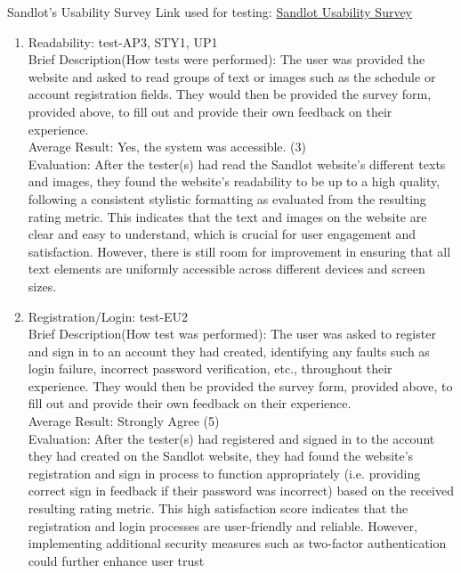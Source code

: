 \documentclass[12pt, titlepage]{article}
\begin{document}
Sandlot's Usability Survey Link used for testing: \href{https://forms.office.com/Pages/ResponsePage.aspx?id=B2M3RCm0rUKMJSjNSW9HcodvkeIlB8lOjrmyIWuVT7dUQ0hBNFRVTjFHWVhITDIzSklZRDRYTVZRMi4u}{Sandlot Usability Survey}

\begin{enumerate}
  \item{Readability: test-AP3, STY1, UP1\\}
  Brief Description(How tests were performed): The user was provided the website and asked
  to read groups of text or images such as the schedule or account registration fields.
  They would then be provided the survey form, provided above, to fill out and provide their own feedback
  on their experience. \\
  Average Result: Yes, the system was accessible. (3)\\
  Evaluation: After the tester(s) had read the Sandlot website's different texts and images,
  they found the website's readability to be up to a high quality, following a consistent
  stylistic formatting as evaluated from the resulting rating metric. This indicates that the
  text and images on the website are clear and easy to understand, which is crucial for user
  engagement and satisfaction. However, there is still room for improvement in ensuring that
  all text elements are uniformly accessible across different devices and screen sizes.
  \item{Registration/Login: test-EU2\\}
  Brief Description(How test was performed): The user was asked to register and sign in to
  an account they had created, identifying any faults such as login failure, incorrect
  password verification, etc., throughout their experience. They would then be provided the survey form, provided above, to fill
  out and provide their own feedback on their experience. \\
  Average Result: Strongly Agree (5)\\
  Evaluation: After the tester(s) had registered and signed in to the account they had
  created on the Sandlot website, they had found the website's registration and sign in process
  to function appropriately (i.e. providing correct sign in feedback if their password was
  incorrect) based on the received resulting rating metric. This high satisfaction score indicates
  that the registration and login processes are user-friendly and reliable. However, implementing
  additional security measures such as two-factor authentication could further enhance user trust

\end{enumerate}
\end{document}
